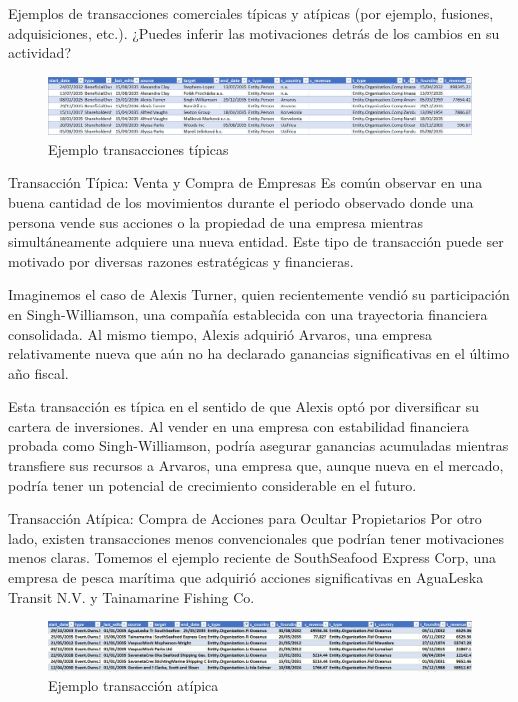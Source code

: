 \documentclass[11pt,spanish,a4paper]{article}
\begin{document}
Ejemplos de transacciones comerciales típicas y atípicas (por ejemplo, fusiones, adquisiciones, etc.). ¿Puedes inferir las motivaciones detrás de los cambios en su actividad?

\begin{figure}[H]
    \centering
    \includegraphics[width=1\linewidth]{graphs/ejercicio_2_1.png}
    \caption{Ejemplo transacciones típicas}
    \label{fig:enter-label}
\end{figure}


Transacción Típica: Venta y Compra de Empresas
Es común observar en una buena cantidad de los movimientos durante el periodo observado donde una persona vende sus acciones o la propiedad de una empresa mientras simultáneamente adquiere una nueva entidad. Este tipo de transacción puede ser motivado por diversas razones estratégicas y financieras.

Imaginemos el caso de Alexis Turner, quien recientemente vendió su participación en Singh-Williamson, una compañía establecida con una trayectoria financiera consolidada. Al mismo tiempo, Alexis adquirió Arvaros, una empresa relativamente nueva que aún no ha declarado ganancias significativas en el último año fiscal.

Esta transacción es típica en el sentido de que Alexis optó por diversificar su cartera de inversiones. Al vender en una empresa con estabilidad financiera probada como Singh-Williamson, podría asegurar ganancias acumuladas mientras transfiere sus recursos a Arvaros, una empresa que, aunque nueva en el mercado, podría tener un potencial de crecimiento considerable en el futuro.

Transacción Atípica: Compra de Acciones para Ocultar Propietarios
Por otro lado, existen transacciones menos convencionales que podrían tener motivaciones menos claras. Tomemos el ejemplo reciente de SouthSeafood Express Corp, una empresa de pesca marítima que adquirió acciones significativas en AguaLeska Transit N.V. y Tainamarine Fishing Co.

\begin{figure}[H]
    \centering
    \includegraphics[width=1\linewidth]{graphs/ejercicio_2_2.png}
    \caption{Ejemplo transacción atípica}
    \label{fig:enter-label}
\end{figure}
\end{document}
